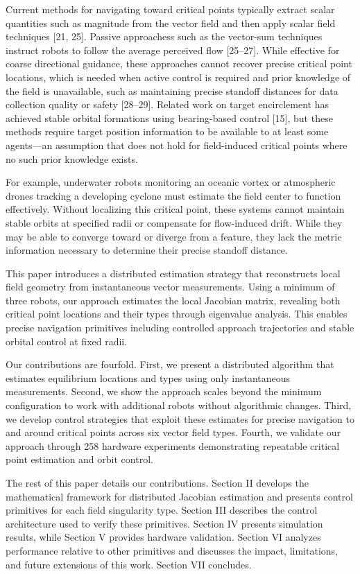 \documentclass[lettersize,journal]{IEEEtran}
\begin{document}
Current methods for navigating toward critical points typically extract scalar quantities such as magnitude from the vector field and then apply scalar field techniques [21, 25]. Passive approachess such as the vector-sum techniques instruct robots to follow the average perceived flow [25--27]. While effective for coarse directional guidance, these approaches cannot recover precise critical point locations, which is needed when active control is required and prior knowledge of the field is unavailable, such as maintaining precise standoff distances for data collection quality or safety [28--29]. Related work on target encirclement has achieved stable orbital formations using bearing-based control [15], but these methods require target position information to be available to at least some agents—an assumption that does not hold for field-induced critical points where no such prior knowledge exists.

For example, underwater robots monitoring an oceanic vortex or atmospheric drones tracking a developing cyclone must estimate the field center to function effectively. Without localizing this critical point, these systems cannot maintain stable orbits at specified radii or compensate for flow-induced drift. While they may be able to converge toward or diverge from a feature, they lack the metric information necessary to determine their precise standoff distance.

This paper introduces a distributed estimation strategy that reconstructs local field geometry from instantaneous vector measurements. Using a minimum of three robots, our approach estimates the local Jacobian matrix, revealing both critical point locations and their types through eigenvalue analysis. This enables precise navigation primitives including controlled approach trajectories and stable orbital control at fixed radii.

Our contributions are fourfold. First, we present a distributed algorithm that estimates equilibrium locations and types using only instantaneous measurements. Second, we show the approach scales beyond the minimum configuration to work with additional robots without algorithmic changes. Third, we develop control strategies that exploit these estimates for precise navigation to and around critical points across six vector field types. Fourth, we validate our approach through 258 hardware experiments demonstrating repeatable critical point estimation and orbit control.

The rest of this paper details our contributions. Section II develops the mathematical framework for distributed Jacobian estimation and presents control primitives for each field singularity type. Section III describes the control architecture used to verify these primitives. Section IV presents simulation results, while Section V provides hardware validation. Section VI analyzes performance relative to other primitives and discusses the impact, limitations, and future extensions of this work. Section VII concludes.
\end{document}
